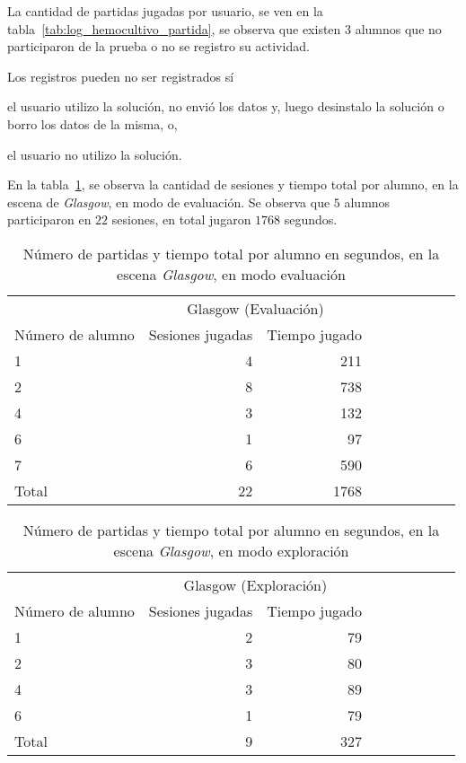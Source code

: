 La cantidad de partidas jugadas por usuario, se ven en la
tabla~\ref{tab:log_hemocultivo_partida}, se observa que existen $3$ alumnos que no
participaron de la prueba o no se registro su actividad.

Los registros pueden no ser registrados sí
\begin{enumerate*}[label=\itshape\alph*\upshape)]
    \item el usuario utilizo la solución, no envió los datos y, luego
        desinstalo la solución o borro los datos de la misma, o,
    \item el usuario no utilizo la solución.
\end{enumerate*}

En la tabla~\ref{tab:log_glasgow_random_partida}, se observa la cantidad de
sesiones y tiempo total por alumno, en la escena de \textit{Glasgow}, en modo de
evaluación. Se observa que $5$ alumnos participaron en $22$ sesiones, en total
jugaron $1768$ segundos.

\begin{table}[H]
\centering
\begin{tabular}{lrrrrrrrr}
\toprule
& \multicolumn{2}{c}{Glasgow (Evaluación)} \\
                   \cmidrule(lr){2-3} 
Número de alumno   & Sesiones jugadas                            & Tiempo jugado \\
\midrule
1     & 4  & 211 \\
2     & 8  & 738 \\
4     & 3  & 132 \\
6     & 1  & 97  \\
7     & 6  & 590 \\
\midrule
Total & 22 & 1768 \\
\bottomrule
\end{tabular}
\caption{Número de partidas y tiempo total por alumno en segundos, en la escena
    \textit{Glasgow}, en modo evaluación}
\label{tab:log_glasgow_random_partida}
\end{table}


\begin{table}[H]
\centering
\begin{tabular}{lrrrrrrrr}
\toprule
& \multicolumn{2}{c}{Glasgow (Exploración)} \\
                   \cmidrule(lr){2-3} 
Número de alumno   & Sesiones jugadas                            & Tiempo jugado \\
\midrule
1        & 2 & 79 \\
2        & 3 & 80 \\
4        & 3 & 89 \\
6        & 1 & 79 \\
\midrule
Total   & 9 & 327 \\
\bottomrule
\end{tabular}
\caption{Número de partidas y tiempo total por alumno en segundos, en la escena
    \textit{Glasgow}, en modo exploración}
\label{tab:log_glasgow_custom_partida}
\end{table}


